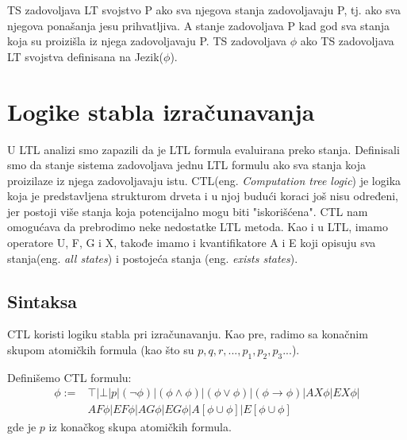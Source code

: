 \documentclass[a4paper]{article}
\begin{document}
{	TS zadovoljava LT svojstvo P ako sva njegova stanja zadovoljavaju P, tj. ako sva njegova ponašanja jesu prihvatljiva. A stanje zadovoljava P kad god sva stanja koja su proizišla iz njega zadovoljavaju P. TS zadovoljava  $\phi$ ako TS zadovoljava LT svojstva definisana na Jezik($\phi$).\cite{reeves1990logic}


	\section{Logike stabla izračunavanja}
	\label{sec:CTL}
	U LTL analizi smo zapazili da je LTL formula evaluirana preko stanja. Definisali smo da stanje sistema
	zadovoljava jednu LTL formulu ako sva stanja koja proizilaze iz njega zadovoljavaju istu. CTL(eng. \emph{Computation tree logic}) je logika koja je predstavljena strukturom drveta i u njoj budući koraci još nisu
	određeni, jer postoji više stanja koja potencijalno mogu biti "iskorišćena".
	CTL nam omogućava da prebrodimo neke nedostatke LTL metoda. Kao i u LTL, imamo operatore U, F, G i X, takođe imamo i kvantifikatore
	A i E koji opisuju sva stanja(eng. \emph{all states}) i postojeća stanja (eng. \emph{exists states}). 

\subsection{Sintaksa}
	\label{subsec:podnaslovN}
	CTL koristi logiku stabla pri izračunavanju. 
	Kao pre, radimo sa konačnim skupom atomičkih formula (kao što su $p, q, r,...,p_1,p_2,p_3...$).

	Definišemo CTL formulu:
\begin{equation}
\begin{split}
\phi := &\top| \bot | p | (\neg \phi) | (\phi \wedge \phi) | (\phi \vee \phi) | (\phi \rightarrow \phi)| AX\phi | EX\phi | \\
          &  AF\phi | EF\phi | AG\phi | EG\phi | A[\phi \cup \phi] | E[\phi \cup \phi]
\end{split}
\end{equation}
	gde je $p$ iz konačkog skupa atomičkih formula.
	\newline
	
}
\end{document}
